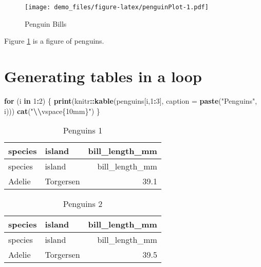 \documentclass[
]{article}
\newenvironment{Shaded}{\begin{snugshade}}{\end{snugshade}}
\newcommand{\AttributeTok}[1]{\textcolor[rgb]{0.13,0.29,0.53}{#1}}
\newcommand{\ControlFlowTok}[1]{\textcolor[rgb]{0.13,0.29,0.53}{\textbf{#1}}}
\newcommand{\DecValTok}[1]{\textcolor[rgb]{0.00,0.00,0.81}{#1}}
\newcommand{\FunctionTok}[1]{\textcolor[rgb]{0.13,0.29,0.53}{\textbf{#1}}}
\newcommand{\NormalTok}[1]{#1}
\newcommand{\SpecialCharTok}[1]{\textcolor[rgb]{0.81,0.36,0.00}{\textbf{#1}}}
\newcommand{\StringTok}[1]{\textcolor[rgb]{0.31,0.60,0.02}{#1}}
\begin{document}
\begin{figure}
\centering
\texttt{[image: demo\_files/figure-latex/penguinPlot-1.pdf]}
\caption{\label{fig:penguinPlot}Penguin Bills}
\end{figure}

Figure \ref{fig:penguinPlot} is a figure of penguins.

\section{Generating tables in a loop}\label{generating-tables-in-a-loop}

\begin{Shaded}
\begin{Highlighting}[]
\ControlFlowTok{for}\NormalTok{ (i }\ControlFlowTok{in} \DecValTok{1}\SpecialCharTok{:}\DecValTok{2}\NormalTok{)}
\NormalTok{\{}
  \FunctionTok{print}\NormalTok{(knitr}\SpecialCharTok{::}\FunctionTok{kable}\NormalTok{(penguins[i,}\DecValTok{1}\SpecialCharTok{:}\DecValTok{3}\NormalTok{], }\AttributeTok{caption =} \FunctionTok{paste}\NormalTok{(}\StringTok{"Penguins"}\NormalTok{, i)))}
  \FunctionTok{cat}\NormalTok{(}\StringTok{"}\SpecialCharTok{\textbackslash{}\textbackslash{}}\StringTok{vspace\{10mm\}"}\NormalTok{)}
\NormalTok{\}}
\end{Highlighting}
\end{Shaded}

\begin{longtable}[]{@{}llr@{}}
\caption{Penguins 1}\tabularnewline
\toprule\noalign{}
species & island & bill\_length\_mm \\
\midrule\noalign{}
\endfirsthead
\toprule\noalign{}
species & island & bill\_length\_mm \\
\midrule\noalign{}
\endhead
\bottomrule\noalign{}
\endlastfoot
Adelie & Torgersen & 39.1 \\
\end{longtable}

\vspace{10mm}

\begin{longtable}[]{@{}llr@{}}
\caption{Penguins 2}\tabularnewline
\toprule\noalign{}
species & island & bill\_length\_mm \\
\midrule\noalign{}
\endfirsthead
\toprule\noalign{}
species & island & bill\_length\_mm \\
\midrule\noalign{}
\endhead
\bottomrule\noalign{}
\endlastfoot
Adelie & Torgersen & 39.5 \\
\end{longtable}
\end{document}
